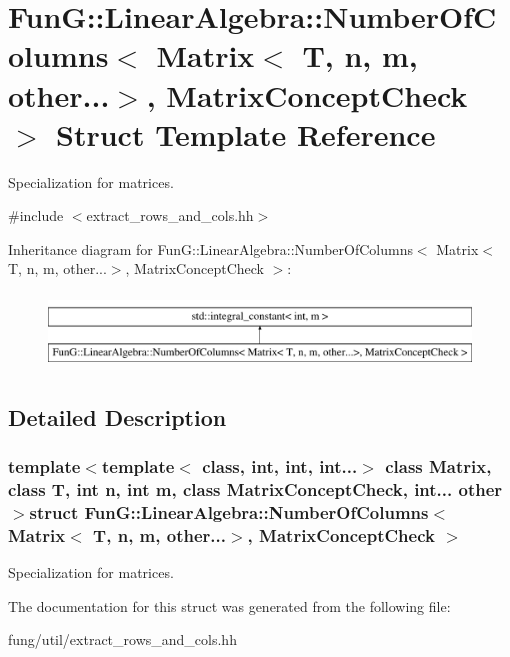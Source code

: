 \hypertarget{structFunG_1_1LinearAlgebra_1_1NumberOfColumns_3_01Matrix_3_01T_00_01n_00_01m_00_01other_8_8_8_4_00_01MatrixConceptCheck_01_4}{\section{Fun\-G\-:\-:Linear\-Algebra\-:\-:Number\-Of\-Columns$<$ Matrix$<$ T, n, m, other...$>$, Matrix\-Concept\-Check $>$ Struct Template Reference}
\label{structFunG_1_1LinearAlgebra_1_1NumberOfColumns_3_01Matrix_3_01T_00_01n_00_01m_00_01other_8_8_8_4_00_01MatrixConceptCheck_01_4}
}


Specialization for matrices.  




{\ttfamily \#include $<$extract\-\_\-rows\-\_\-and\-\_\-cols.\-hh$>$}

Inheritance diagram for Fun\-G\-:\-:Linear\-Algebra\-:\-:Number\-Of\-Columns$<$ Matrix$<$ T, n, m, other...$>$, Matrix\-Concept\-Check $>$\-:\begin{figure}[H]
\begin{center}
\leavevmode
\includegraphics[height=2.000000cm]{structFunG_1_1LinearAlgebra_1_1NumberOfColumns_3_01Matrix_3_01T_00_01n_00_01m_00_01other_8_8_8_4_00_01MatrixConceptCheck_01_4}
\end{center}
\end{figure}


\subsection{Detailed Description}
\subsubsection*{template$<$template$<$ class, int, int, int...$>$ class Matrix, class T, int n, int m, class Matrix\-Concept\-Check, int... other$>$struct Fun\-G\-::\-Linear\-Algebra\-::\-Number\-Of\-Columns$<$ Matrix$<$ T, n, m, other...$>$, Matrix\-Concept\-Check $>$}

Specialization for matrices. 

The documentation for this struct was generated from the following file\-:\begin{DoxyCompactItemize}
\item 
fung/util/extract\-\_\-rows\-\_\-and\-\_\-cols.\-hh\end{DoxyCompactItemize}
